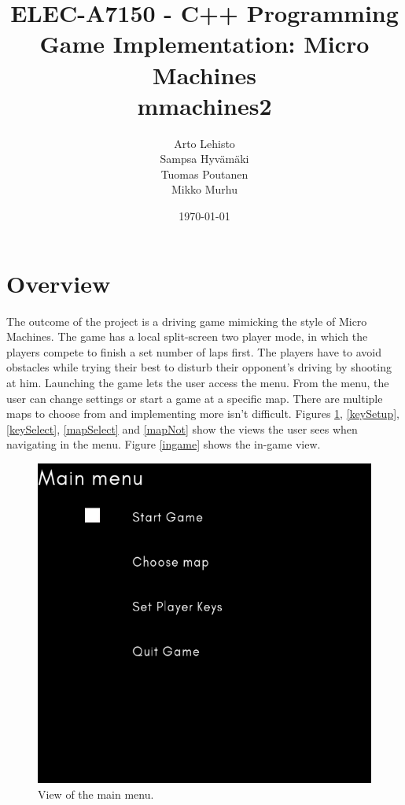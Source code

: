 \documentclass{article} %
\title{ELEC-A7150 - C++ Programming \\Game Implementation: Micro Machines \\ mmachines2}
\date{\today}
\author{Arto Lehisto \\ Sampsa Hyvämäki \\ Tuomas Poutanen \\ Mikko Murhu\\}
\begin{document}
\maketitle

\newpage

\tableofcontents

\newpage

\section{Overview}

The outcome of the project is a driving game mimicking the style of Micro Machines. The game has a local split-screen two player mode, in which the players compete to finish a set number of laps first. The players have to avoid obstacles while trying their best to disturb their opponent’s driving by shooting at him. Launching the game lets the user access the menu. From the menu, the user can change settings or start a game at a specific map. There are multiple maps to choose from and implementing more isn’t difficult. Figures \ref{mainMenu}, \ref{keySetup}, \ref{keySelect}, \ref{mapSelect} and \ref{mapNot} show the views the user sees when navigating in the menu. Figure \ref{ingame} shows the in-game view.

\begin{figure}[H]
\centering
\includegraphics[width=120mm]{images/mainmenu}
\caption{View of the main menu.}
\label{mainMenu}
\end{figure}  
\end{document}
